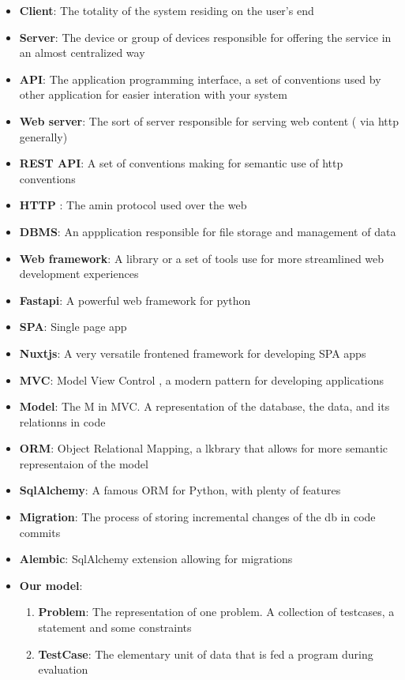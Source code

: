 \begin{itemize}[]
    \item \textbf{Client}: The totality of the system residing on the user's end 
    \item \textbf{Server}: The device or group of devices responsible for offering the service in an almost centralized way 
    \item \textbf{API}: The application programming interface, a set of conventions used by other application for easier interation with your system 
    \item \textbf{Web server}: The sort of server responsible for serving web content ( via http generally)
    \item \textbf{REST API}: A set of conventions making for semantic use of http conventions 
    \item \textbf{HTTP }: The amin protocol used over the web 
    \item \textbf{DBMS}: An appplication responsible for file storage and management of data 
    \item \textbf{Web framework}: A library or a set of tools use for more streamlined web development experiences
    \item \textbf{Fastapi}: A powerful web framework for python 
    \item \textbf{SPA}: Single page app 
    \item \textbf{Nuxtjs}: A very versatile frontened framework for developing SPA apps 
    \item \textbf{MVC}: Model View Control , a modern pattern for developing applications
    \item \textbf{Model}: The M in MVC. A representation of the database, the data, and its relationns in code
    \item \textbf{ORM}: Object Relational Mapping, a lkbrary that allows for more semantic representaion of the model
    \item \textbf{SqlAlchemy}: A famous ORM for Python, with plenty of features
    \item \textbf{Migration}: The process of storing incremental changes of the db in code commits
    \item \textbf{Alembic}: SqlAlchemy extension allowing for migrations
    \item \textbf{Our model}:
    \begin{enumerate}
        \item \textbf{Problem}: The representation of one problem. A collection of testcases, a statement and some constraints
        \item \textbf{TestCase}: The elementary unit of data that is fed a program during evaluation

\end{enumerate}
\end{itemize}
